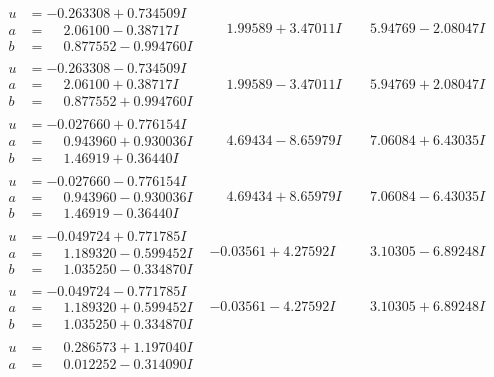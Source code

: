 \documentclass[1p]{elsarticle_modified}
\theoremstyle{definition}
\begin{document}
$$\begin{array}{c|c|c}
\begin{aligned}
u &= -0.263308 + 0.734509 I \\
a &= \phantom{-}2.06100 - 0.38717 I \\
b &= \phantom{-}0.877552 - 0.994760 I\end{aligned}
 & \phantom{-}1.99589 + 3.47011 I & \phantom{-}5.94769 - 2.08047 I \\ \hline\begin{aligned}
u &= -0.263308 - 0.734509 I \\
a &= \phantom{-}2.06100 + 0.38717 I \\
b &= \phantom{-}0.877552 + 0.994760 I\end{aligned}
 & \phantom{-}1.99589 - 3.47011 I & \phantom{-}5.94769 + 2.08047 I \\ \hline\begin{aligned}
u &= -0.027660 + 0.776154 I \\
a &= \phantom{-}0.943960 + 0.930036 I \\
b &= \phantom{-}1.46919 + 0.36440 I\end{aligned}
 & \phantom{-}4.69434 - 8.65979 I & \phantom{-}7.06084 + 6.43035 I \\ \hline\begin{aligned}
u &= -0.027660 - 0.776154 I \\
a &= \phantom{-}0.943960 - 0.930036 I \\
b &= \phantom{-}1.46919 - 0.36440 I\end{aligned}
 & \phantom{-}4.69434 + 8.65979 I & \phantom{-}7.06084 - 6.43035 I \\ \hline\begin{aligned}
u &= -0.049724 + 0.771785 I \\
a &= \phantom{-}1.189320 - 0.599452 I \\
b &= \phantom{-}1.035250 - 0.334870 I\end{aligned}
 & -0.03561 + 4.27592 I & \phantom{-}3.10305 - 6.89248 I \\ \hline\begin{aligned}
u &= -0.049724 - 0.771785 I \\
a &= \phantom{-}1.189320 + 0.599452 I \\
b &= \phantom{-}1.035250 + 0.334870 I\end{aligned}
 & -0.03561 - 4.27592 I & \phantom{-}3.10305 + 6.89248 I \\ \hline\begin{aligned}
u &= \phantom{-}0.286573 + 1.197040 I \\
a &= \phantom{-}0.012252 - 0.314090 I \\

\end{aligned}
\end{array}$$
\end{document}
